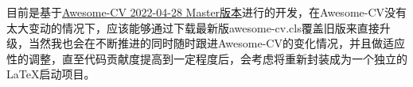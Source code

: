 {\dk}目前是基于\hyperref{https://github.com/posquit0/Awesome-CV}{}{}{Awesome-CV 2022-04-28 Master版本}进行的开发，在Awesome-CV没有太大变动的情况下，应该能够通过下载最新版awesome-cv.cls覆盖旧版来直接升级，当然我也会在不断推进{\dk}的同时随时跟进Awesome-CV的变化情况，并且做适应性的调整，直至代码贡献度提高到一定程度后，会考虑将{\dk}重新封装成为一个独立的{\LaTeX}启动项目。

\clearpage
